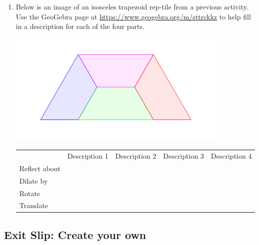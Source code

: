 \begin{enumerate}
\begin{center}
    \end{center}
    \item Below is an image of an isosceles trapezoid rep-tile from a previous activity. Use the GeoGebra page at \hyperlink{https://www.geogebra.org/m/sttrckkz}{https://www.geogebra.org/m/sttrckkz} to help fill in a description for each of the four parts.
	\begin{center}
        \includegraphics[width=4.2in]{images/Trap-Reptile}
    \end{center}
			\setlength{\extrarowheight}{20pt}
			\begin{tabular}{l|c|c|c|c|}
			\multicolumn{1}{l}{} & \multicolumn{1}{c}{Description 1} & \multicolumn{1}{c}{Description 2} & \multicolumn{1}{c}{Description 3} & \multicolumn{1}{c}{Description 4}\tabularnewline
			\cline{2-5} \cline{3-5} \cline{4-5} \cline{5-5} 
			Reflect about & &  &  & \tabularnewline
			\cline{2-5} \cline{3-5} \cline{4-5} \cline{5-5} 
			Dilate by & &  &  & \tabularnewline
			\cline{2-5} \cline{3-5} \cline{4-5} \cline{5-5} 
			Rotate & &  &  & \tabularnewline
			\cline{2-5} \cline{3-5} \cline{4-5} \cline{5-5} 
			Translate &  &  &  & \tabularnewline
			\cline{2-5} \cline{3-5} \cline{4-5} \cline{5-5} 
			\end{tabular}
			\setlength{\extrarowheight}{0pt}

\end{enumerate}

\wbnewpage

\subsection{Exit Slip: Create your own}

